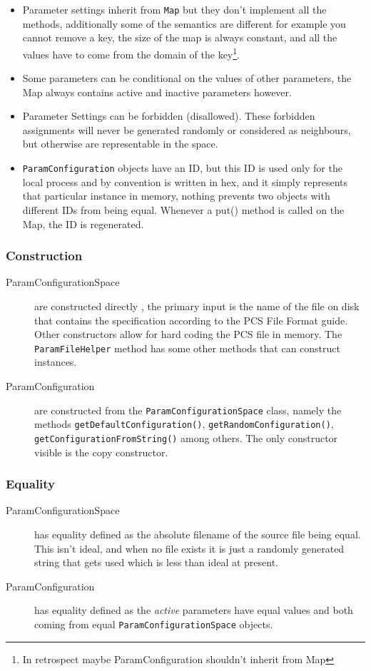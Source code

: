 \documentclass[11pt,letterpaper,oneside]{article}
\begin{document}
\begin{itemize}
\item Parameter settings inherit from \texttt{Map} but they don't implement all the methods, additionally some of the semantics are different for example you cannot remove a key, the size of the map is always constant, and all the values have to come from the domain of the key\footnote{In retrospect maybe ParamConfiguration shouldn't inherit from Map}.
\item Some parameters can be conditional on the values of other parameters, the Map always contains active and inactive parameters however.
\item Parameter Settings can be forbidden (disallowed). These forbidden assignments will never be generated randomly or considered as neighbours, but otherwise are representable in the space.
\item \texttt{ParamConfiguration} objects have an ID, but this ID is used only for the local process and by convention is written in hex, and it simply represents that particular instance in memory, nothing prevents two objects with different IDs from being equal. Whenever a put() method is called on the Map, the ID is regenerated. 

\end{itemize}

\subsubsection{Construction}
\begin{description}
\item[ParamConfigurationSpace] are constructed directly , the primary input is the name of the file on disk that contains the specification according to the PCS File Format guide. Other constructors allow for hard coding the PCS file in memory. The \texttt{ParamFileHelper} method has some other methods that can construct instances.
\item[ParamConfiguration] are constructed from the \texttt{ParamConfigurationSpace} class, namely the methods \texttt{getDefaultConfiguration()}, \texttt{getRandomConfiguration()}, \texttt{getConfigurationFromString()} among others. The only constructor visible is the copy constructor.
\end{description}

\subsubsection{Equality}
\begin{description}
\item[ParamConfigurationSpace] has equality defined as the absolute filename of the source file being equal. This isn't ideal, and when no file exists it is just a randomly generated string that gets used which is less than ideal at present.
\item[ParamConfiguration] has equality defined as the \emph{active} parameters have equal values and both coming from equal \texttt{ParamConfigurationSpace} objects.
\end{description}
\end{document}
